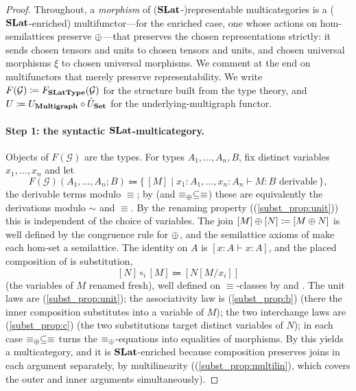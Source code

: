 \begin{proof}
Throughout, a \emph{morphism} of ($\mathbf{SLat}$-)representable multicategories is a ($\mathbf{SLat}$-enriched) multifunctor---for the enriched case, one whose actions on hom-semilattices preserve $\mathbin{\oplus}$---that preserves the chosen representations strictly: it sends chosen tensors and units to chosen tensors and units, and chosen universal morphisms $\xi$ to chosen universal morphisms.
We comment at the end on multifunctors that merely preserve representability.
We write $F(\mathcal{G}) \mathrel{\vcentcolon\mathrel{\mkern-1.2mu}=} F_{\mathbf{SLatType}}(\mathcal{G})$ for the structure built from the type theory, and $U \mathrel{\vcentcolon\mathrel{\mkern-1.2mu}=} U_{\mathbf{Multigraph}} \circ \hat{U}_{\mathbf{Set}}$ for the underlying-multigraph functor.

\paragraph{Step 1: the syntactic $\mathbf{SLat}$-multicategory.}
Objects of $F(\mathcal{G})$ are the types.
For types $A_1, \ldots, A_n, B$, fix distinct variables $x_1, \ldots, x_n$ and let
\[
F(\mathcal{G})(A_1, \ldots, A_n; B) \Coloneqq \{\, [M] \mid x_1 : A_1, \ldots, x_n : A_n \vdash M : B \text{ derivable} \,\},
\]
the derivable terms modulo $\equiv$; by  (and $\equiv_{\mathbin{\oplus}} \subseteq \equiv$) these are equivalently the derivations modulo $\sim$ and $\equiv$.
By the renaming property ((\ref{subst_prop:unit})) this is independent of the choice of variables.
The join $[M] \mathbin{\oplus} [N] \mathrel{\vcentcolon\mathrel{\mkern-1.2mu}=} [M \mathbin{\oplus} N]$ is well defined by the congruence rule for $\mathbin{\oplus}$, and the semilattice axioms of  make each hom-set a semilattice.
The identity on $A$ is $[x : A \vdash x : A]$, and the placed composition of  is substitution,
\[
[N] \circ_{i} [M] \Coloneqq [N[M/x_i]]
\]
(the variables of $M$ renamed fresh), well defined on $\equiv$-classes by  and .
The unit laws are (\ref{subst_prop:unit}); the associativity law is (\ref{subst_prop:b}) (there the inner composition substitutes into a variable of $M$); the two interchange laws are (\ref{subst_prop:c}) (the two substitutions target distinct variables of $N$); in each case $\equiv_{\mathbin{\oplus}} \subseteq \equiv$ turns the $\equiv_{\mathbin{\oplus}}$-equations into equalities of morphisms.
By  this yields a multicategory, and it is $\mathbf{SLat}$-enriched because composition preserves joins in each argument separately, by multilinearity ((\ref{subst_prop:multilin}), which covers the outer and inner arguments simultaneously).


\end{proof}
